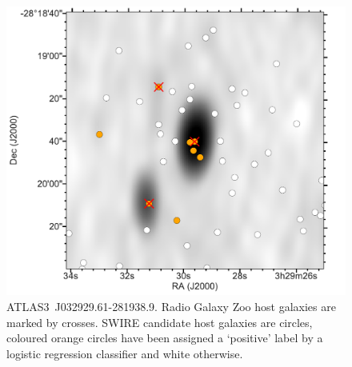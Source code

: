 \documentclass[fleqn,usenatbib,usedcolumn]{mnras}
\begin{document}
    \begin{figure}
      \centering
      \includegraphics[width=\columnwidth]{images/positives.pdf}
      \caption{ATLAS3~J032929.61-281938.9. Radio Galaxy Zoo host galaxies are
      marked by crosses. SWIRE candidate host galaxies are circles, coloured orange
      circles have been assigned a `positive' label by a logistic regression
      classifier and white otherwise.
      \label{fig:positives}}
    \end{figure}
\end{document}
